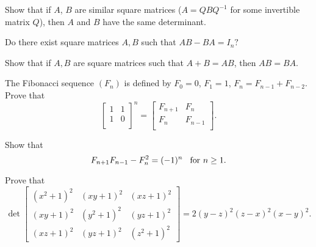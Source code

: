 \documentclass[12pt]{article}
\begin{document}
        \begin{exercise}
            Show that if $A$, $B$ are similar square matrices ($A = QBQ^{-1}$ for some invertible matrix $Q$), then $A$ and $B$ have the same determinant.   
        \end{exercise}

        \begin{exercise}
            Do there exist square matrices $A, B$ such that $AB - BA = I_{n}?$  
        \end{exercise}
        
        \begin{exercise}
            Show that if $A, B$ are square matrices such that $A + B = AB$, then $AB = BA$. 
        \end{exercise}
        
        \begin{exercise}
        The Fibonacci sequence $(F_{n})$ is defined by $F_{0} = 0$, $F_{1} = 1$, $F_{n} = F_{n - 1} + F_{n - 2}$. Prove that 
        \[\begin{bmatrix}
            1&1\\
            1&0\\
        \end{bmatrix}^{n} = \begin{bmatrix}
            F_{n + 1}&F_{n}\\
            F_{n}&F_{n - 1}\\
            \end{bmatrix}.
        \]
        \end{exercise}
        
        \begin{exercise}
        Show that 
        \[F_{n + 1}F_{n - 1} - F_{n}^{2} = (-1)^{n} \hspace*{3mm} \text{for } n \geq 1. 
        \]
        \end{exercise}
        
        \begin{exercise}
        Prove that 
        \[
        \det \begin{bmatrix}
        (x^{2} + 1)^{2}&(xy + 1)^{2}&(xz + 1)^{2}\\
        (xy + 1)^{2}&(y^{2} + 1)^{2}&(yz + 1)^{2}\\
        (xz + 1)^{2}&(yz + 1)^{2}&(z^{2} + 1)^{2}
        \end{bmatrix} = 2(y - z)^{2}(z - x)^{2}(x - y)^{2}.\]
        \end{exercise}
        
\end{document}
